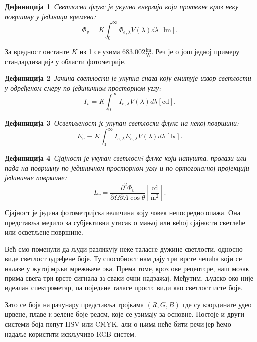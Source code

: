 \documentclass[12pt, a4paper, twoside]{book}
\numberwithin{equation}{chapter}
\numberwithin{theorem}{section}
\newtheorem{definition}{Дефиниција}
\numberwithin{definition}{section}
\numberwithin{definitionChapter}{chapter}
\begin{document}
\begin{definition}
	Светлосни флукс је укупна енергија која протекне кроз неку површину у јединици времена:
	$$\Phi_v = K\int_{0}^{\infty}\Phi_{e, \lambda} V(\lambda)d\lambda \left[\mathrm{lm}\right].$$
	\label{eqn-luminuous-flux}
\end{definition}

За вредност онстанте $K$ из \ref{eqn-luminuous-flux} се узима $683.002 \mathrm{\frac{lm}{W}}$. Реч
је о још једној примеру стандардизације у области фотометрије.

\begin{definition}
	Јачина светлости је укупна снага коју емитује извор светлости у одређеном смеру по јединичном
	просторном углу:
	$$I_v = K \int_{0}^{\infty}I_{e, \lambda}V(\lambda)d\lambda \left[\mathrm{cd}\right].$$
\end{definition}

\begin{definition}
	Осветљеност је укупан светлосни флукс на некој површини:
	$$E_v = K\int_{0}^{\infty}I_{e, \lambda}E_{e, \lambda}V(\lambda)d\lambda \left[\mathrm{lx}\right].$$
\end{definition}

\begin{definition}
	Сјајност је укупан светлоснi флукс који напушта, пролази или пада на површину по јединичном просторном
	углу и по ортогоналној пројекцији јединичне површине:
	$$L_v = \frac{\partial^2\Phi_v}{\partial\Omega\partial A \cos\theta} \left[\mathrm{\frac{cd}{m^2}}\right].$$
\end{definition}

Сјајност је једина фотометријска величина коју човек непосредно опажа. Она представља мерило за субјективни утисак
о мањој или већој сјајности светлеће или осветљене површине.

Већ смо поменули да људи разликују неке таласне дужине светлости, односно виде светлост одређене боје. Ту
способност нам дају три врсте чепића који се налазе у жутој мрљи мрежњаче ока. Према томе, кроз ове рецепторе,
наш мозак прима свега три врсте сигнала за сваки очни надражај. Међутим, људско око није идеалан спектрометар, па
поједине таласе просто види као светлост исте боје.

Зато се боја на рачунару представља тројкама $(R, G, B)$ где су координате удео црвене, плаве и зелене боје редом, које
се узимају за основне. Постоје и други системи боја попут HSV или CMYK, али о њима неће бити речи јер ћемо надаље
користити искључиво RGB систем.
\end{document}
